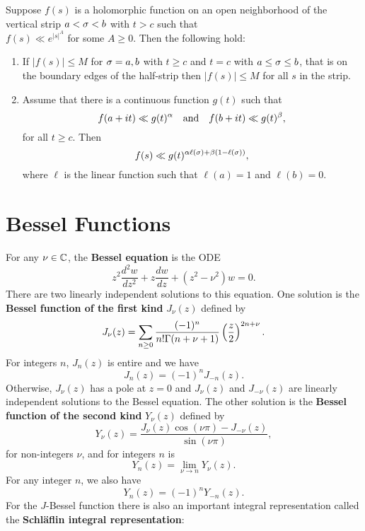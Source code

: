     \begin{theorem*}\label{thm:Phragmen-Lindelof_convexity_principle_half-strip}
      Suppose $f(s)$ is a holomorphic function on an open neighborhood of the vertical strip $a < \sigma < b$ with $t > c$ such that \\ $f(s) \ll e^{|s|^{A}}$ for some $A \ge 0$. Then the following hold:
      \begin{enumerate}[label=(\roman*)]
        \item If $|f(s)| \le M$ for $\sigma = a,b$ with $t \ge c$ and $t = c$ with $a \le \sigma \le b$, that is on the boundary edges of the half-strip then $|f(s)| \le M$ for all $s$ in the strip.
        \item Assume that there is a continuous function $g(t)$ such that
        \[
          f(a+it) \ll g(t)^{\alpha} \quad \text{and} \quad f(b+it) \ll g(t)^{\beta},
        \]
        for all $t \ge c$. Then
        \[
          f(s) \ll g(t)^{\alpha\ell(\sigma)+\beta(1-\ell(\sigma))},
        \]
        where $\ell$ is the linear function such that $\ell(a) = 1$ and $\ell(b) = 0$.
      \end{enumerate}
    \end{theorem*}
  \section{Bessel Functions}\label{append:Bessel_Functions}
    For any $\nu \in \mathbb{C}$, the \textbf{Bessel equation} is the ODE
    \[
      z^{2}\frac{d^{2}w}{dz^{2}}+z\frac{dw}{dz}+(z^{2}-\nu^{2})w = 0.
    \]
    There are two linearly independent solutions to this equation. One solution is the \textbf{Bessel function of the first kind} $J_{\nu}(z)$ defined by
    \[
      J_{\nu}(z) = \sum_{n \ge 0}\frac{(-1)^{n}}{n!\Gamma(n+\nu+1)}\left(\frac{z}{2}\right)^{2n+\nu}.
    \]
    For integers $n$, $J_{n}(z)$ is entire and we have
    \[
      J_{n}(z) = (-1)^{n}J_{-n}(z).
    \]
    Otherwise, $J_{\nu}(z)$ has a pole at $z = 0$ and $J_{\nu}(z)$ and $J_{-\nu}(z)$ are linearly independent solutions to the Bessel equation. The other solution is the \textbf{Bessel function of the second kind} $Y_{\nu}(z)$ defined by
    \[
      Y_{\nu}(z) = \frac{J_{\nu}(z)\cos(\nu\pi)-J_{-\nu}(z)}{\sin(\nu\pi)},
    \]
    for non-integers $\nu$, and for integers $n$ is
    \[
      Y_{n}(z) = \lim_{\nu \to n}Y_{\nu}(z).
    \]
    For any integer $n$, we also have
    \[
      Y_{n}(z) = (-1)^{n}Y_{-n}(z).
    \]
    For the $J$-Bessel function there is also an important integral representation called the \textbf{Schl\"aflin integral representation}:

